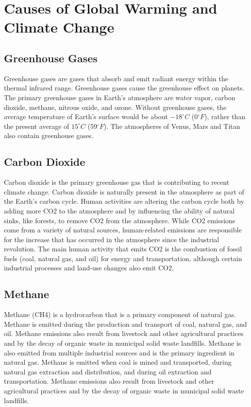 \documentclass{article}
\begin{document}
\section{Causes of Global Warming and Climate Change}

\subsection{Greenhouse Gases}
Greenhouse gases are gases that absorb and emit radiant energy within the
thermal infrared range. Greenhouse gases cause the greenhouse effect on
planets. The primary greenhouse gases in Earth's atmosphere are water vapor,
carbon dioxide, methane, nitrous oxide, and ozone. Without greenhouse gases,
the average temperature of Earth's surface would be about $-18^{\circ}C$
(0$^{\circ}F$), rather than the present average of $15^{\circ}C$
(59$^{\circ}F$). The atmospheres of Venus, Mars and Titan also contain
greenhouse gases.

\subsection{Carbon Dioxide}
Carbon dioxide is the primary greenhouse gas that is contributing to recent
climate change. Carbon dioxide is naturally present in the atmosphere as part
of the Earth's carbon cycle. Human activities are altering the carbon cycle
both by adding more CO2 to the atmosphere and by influencing the ability of
natural sinks, like forests, to remove CO2 from the atmosphere. While CO2
emissions come from a variety of natural sources, human-related emissions are
responsible for the increase that has occurred in the atmosphere since the
industrial revolution. The main human activity that emits CO2 is the combustion
of fossil fuels (coal, natural gas, and oil) for energy and transportation,
although certain industrial processes and land-use changes also emit CO2.

\subsection{Methane}
Methane (CH4) is a hydrocarbon that is a primary component of natural gas.
Methane is emitted during the production and transport of coal, natural gas,
and oil. Methane emissions also result from livestock and other agricultural
practices and by the decay of organic waste in municipal solid waste landfills.
Methane is also emitted from multiple industrial sources and is the primary
ingredient in natural gas. Methane is emitted when coal is mined and
transported, during natural gas extraction and distribution, and during oil
extraction and transportation. Methane emissions also result from livestock and
other agricultural practices and by the decay of organic waste in municipal
solid waste landfills.
\end{document}
